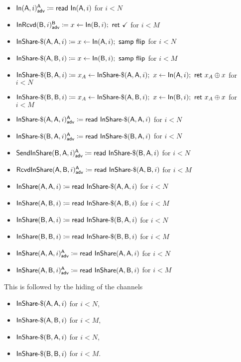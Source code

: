 \begin{itemize}
\item {\color{blue} $\LeakIn(\A,i)^\A_\adv \coloneqq \read{\In(\A,i)}$ for $i < N$}
\item {\color{blue} $\LeakInRcvd(\B,i)^\B_\adv \coloneqq x \leftarrow \In(\B,i); \ \ret{\checkmark}$ for $i < M$}
\item $\InShareGen(\A,\A,i) \coloneqq x \leftarrow \In(\A,i); \ \samp{\flip}$ for $i < N$
\item $\InShareGen(\A,\B,i) \coloneqq x \leftarrow \In(\B,i); \ \samp{\flip}$ for $i < M$
\item $\InShareGen(\B,\A,i) \coloneqq x_A \leftarrow \InShareGen(\A,\A,i); \ x \leftarrow \In(\A,i); \ \ret{x_A \oplus x}$ for $i < N$
\item $\InShareGen(\B,\B,i) \coloneqq x_A \leftarrow \InShareGen(\A,\B,i); \ x \leftarrow \In(\B,i); \ \ret{x_A \oplus x}$ for $i < M$
\item {\color{blue} $\LeakInShareGen(\A,\A,i)^\A_\adv \coloneqq \read{\InShareGen(\A,\A,i)}$ for $i < N$}
\item {\color{blue} $\LeakInShareGen(\B,\A,i)^\A_\adv \coloneqq \read{\InShareGen(\B,\A,i)}$ for $i < N$}
\item {\color{blue} $\LeakSendInShare(\B,\A,i)^\A_\adv \coloneqq \read{\InShareGen(\B,\A,i)}$ for $i < N$}
\item {\color{blue} $\LeakRcvdInShare(\A,\B,i)^\A_\adv \coloneqq \read{\InShareGen(\A,\B,i)}$ for $i < M$}
\item $\InShare(\A,\A,i) \coloneqq \read{\InShareGen(\A,\A,i)}$ for $i < N$
\item $\InShare(\A,\B,i) \coloneqq \read{\InShareGen(\A,\B,i)}$ for $i < M$
\item $\InShare(\B,\A,i) \coloneqq \read{\InShareGen(\B,\A,i)}$ for $i < N$
\item $\InShare(\B,\B,i) \coloneqq \read{\InShareGen(\B,\B,i)}$ for $i < M$
\item {\color{blue} $\LeakInShare(\A,\A,i)^\A_\adv \coloneqq \read{\InShare(\A,\A,i)}$ for $i < N$}
\item {\color{blue} $\LeakInShare(\A,\B,i)^\A_\adv \coloneqq \read{\InShare(\A,\B,i)}$ for $i < M$}
\end{itemize}
This is followed by the hiding of the channels
\begin{itemize}
\item $\InShareGen(\A,\A,i)$ for $i < N$,
\item $\InShareGen(\A,\B,i)$ for $i < M$,
\item $\InShareGen(\B,\A,i)$ for $i < N$,
\item $\InShareGen(\B,\B,i)$ for $i < M$.
\end{itemize}

